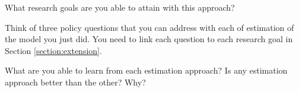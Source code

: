 \begin{exercise} \label{exercise:psapproach}
What research goals are you able to attain with this approach?
\end{exercise}

\begin{exercise}
Think of three policy questions that you can address with each of estimation of the model you just did. You need to link each question to each research goal in Section \ref{section:extension}.
\end{exercise}

\begin{exercise}
What are you able to learn from each estimation approach? Is any estimation approach better than the other? Why?
\end{exercise}